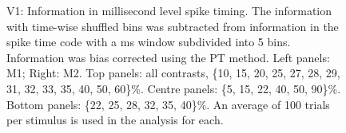 \begin{figure}[htbp]
\begin{subfigure}[b]{0.5\linewidth}
    \end{subfigure}
    \caption{\small{}V1: Information in millisecond level spike timing.
The information with time-wise shuffled bins was subtracted from information in the spike time code with a \unit[20]{ms} window subdivided into 5 bins.
Information was bias corrected using the PT method.
Left panels: M1; Right: M2.
Top panels: all contrasts, \{10, 15, 20, 25, 27, 28, 29, 31, 32, 33, 35, 40, 50, 60\}\%.
Centre panels: \{5, 15, 22, 40, 50, 90\}\%.
Bottom panels: \{22, 25, 28, 32, 35, 40\}\%.
An average of 100 trials per stimulus is used in the analysis for each.
}
    \label{fig:v1-dif}
\end{figure}


% 

